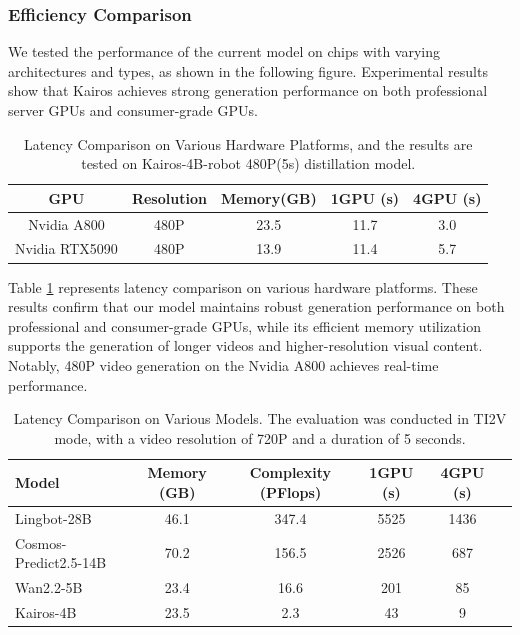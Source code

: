 \subsubsection{Efficiency Comparison}
We tested the performance of the current model on chips with varying architectures and types, as shown in the following figure. Experimental results show that Kairos achieves strong generation performance on both professional server GPUs and consumer-grade GPUs. 
\begin{table}[H]
\centering
\footnotesize
\caption{Latency Comparison on Various Hardware Platforms, and the results are tested on Kairos-4B-robot 480P(5s) distillation model.
}
\label{tab:different hardware}
\begin{tabular}{ccccc}
\toprule
\textbf{GPU} & \textbf{Resolution} & \textbf{Memory(GB)} & \textbf{1GPU (s)} & \textbf{4GPU (s)} \\
\midrule
Nvidia A800  & 480P                & 23.5                & 11.7               & 3.0                \\
Nvidia RTX5090 & 480P              & 13.9                & 11.4               & 5.7                \\
\bottomrule
\end{tabular}
\vspace{0.3em}
\linebreak
\end{table}

Table \ref{tab:different hardware} represents latency comparison on various hardware platforms. These results confirm that our model maintains robust generation performance on both professional and consumer-grade GPUs, while its efficient memory utilization supports the generation of longer videos and higher-resolution visual content. Notably, 480P video generation on the Nvidia A800 achieves real-time performance.

\begin{table}[h]
\centering
\caption{Latency Comparison on Various Models. The evaluation was conducted in TI2V mode, with a video resolution of 720P and a duration of 5 seconds.}
\label{tab:cmp table}
\footnotesize %
\setlength{\tabcolsep}{4pt} %
\begin{tabular}{lccccc} %
\toprule
\textbf{Model}  & \textbf{Memory (GB)} & \textbf{Complexity (PFlops)} & \textbf{1GPU (s)} & \textbf{4GPU (s)} \\
\midrule
Lingbot-28B \cite{lingbot-world}  & 46.1 & 347.4 & 5525 & 1436 \\
Cosmos-Predict2.5-14B \cite{nvidia2025worldsimulationvideofoundation} & 70.2 & 156.5 & 2526 & 687 \\
Wan2.2-5B \cite{wan2025}  & 23.4 & 16.6 & 201 & 85 \\
Kairos-4B  & 23.5 & 2.3 & 43 & 9 \\
\bottomrule
\end{tabular}
\end{table}

